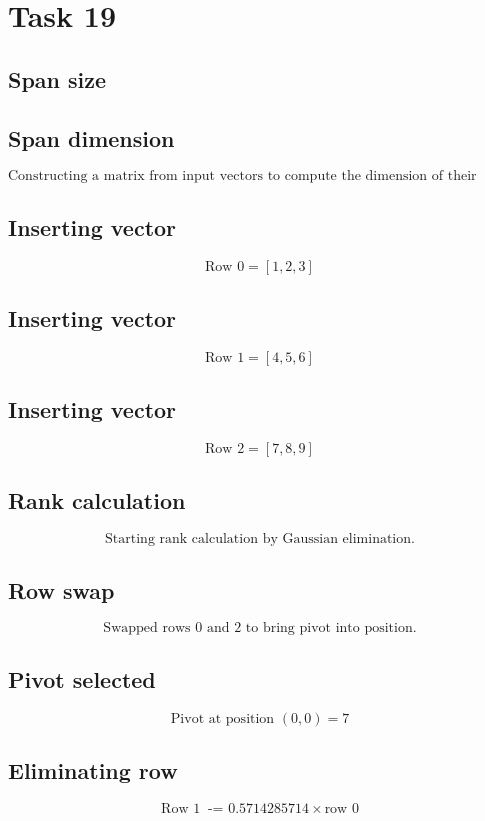\documentclass{article}
\begin{document}
\hrulefill
\bigskip

\section*{Task 19}

\subsection*{Span size}
\subsection*{ \vspace{1em} Span dimension}
\[
\text{Constructing a matrix from input vectors to compute the dimension of their span.}
\]
\subsection*{ \vspace{1em} Inserting vector}
\[
\text{Row } 0 = \left[1, 2, 3\right]
\]
\subsection*{ \vspace{1em} Inserting vector}
\[
\text{Row } 1 = \left[4, 5, 6\right]
\]
\subsection*{ \vspace{1em} Inserting vector}
\[
\text{Row } 2 = \left[7, 8, 9\right]
\]
\subsection*{ \vspace{1em} Rank calculation}
\[
\text{Starting rank calculation by Gaussian elimination.}
\]
\subsection*{ \vspace{1em} Row swap}
\[
\text{Swapped rows } 0 \text{ and } 2 \text{ to bring pivot into position.}
\]
\subsection*{ \vspace{1em} Pivot selected}
\[
\text{Pivot at position } ( 0,0 ) = 7
\]
\subsection*{ \vspace{1em} Eliminating row}
\[
\text{Row } 1\ \text{ -= } 0.5714285714 \times \text{row } 0
\]
\end{document}
